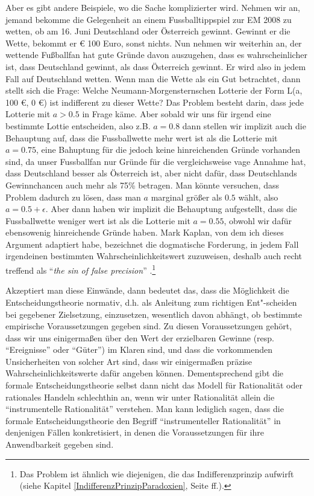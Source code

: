 Aber es gibt andere Beispiele, wo die Sache komplizierter wird. Nehmen wir an,
jemand bekomme die Gelegenheit an einem Fussballtippspiel zur EM 2008 zu wetten,
ob am 16. Juni Deutschland oder Österreich gewinnt. Gewinnt er die Wette, bekommt
er € 100 Euro, sonst nichts. Nun nehmen wir weiterhin an, der wettende Fußballfan
hat gute Gründe davon auszugehen, dass es wahrscheinlicher ist, dass Deutschland
gewinnt, als dass Österreich gewinnt. Er wird also in jedem Fall auf Deutschland
wetten. Wenn man die Wette als ein Gut betrachtet, dann stellt sich die Frage:
Welche Neumann-Morgensternschen Lotterie der Form L(a, 100 €, 0 €) ist
indifferent zu dieser Wette? Das Problem besteht darin, dass jede Lotterie mit $a
> 0.5$ in Frage käme. Aber sobald wir uns für irgend eine bestimmte Lottie
entscheiden, also z.B. $a = 0.8$ dann stellen wir implizit auch die Behauptung
auf, dass die Fussballwette mehr wert ist als die Lotterie mit $a = 0.75$, eine
Bahuptung für die jedoch keine hinreichenden Gründe vorhanden sind, da unser
Fussballfan nur Gründe für die vergleichsweise vage Annahme hat, dass Deutschland
besser als Österreich ist, aber nicht dafür, dass Deutschlands Gewinnchancen auch
mehr als 75\% betragen. Man könnte versuchen, dass Problem dadurch zu lösen, dass
man $a$ marginal größer als $0.5$ wählt, also $a = 0.5 + \epsilon $. Aber dann
haben wir implizit die Behauptung aufgestellt, dass die Fussballwette weniger
wert ist als die Lotterie mit $a = 0.55$, obwohl wir dafür ebensowenig
hinreichende Gründe haben. Mark Kaplan, von dem ich dieses Argument adaptiert
habe, bezeichnet die dogmatische Forderung, in jedem Fall
irgendeinen bestimmten Wahrscheinlichkeitswert zuzuweisen, deshalb auch recht
treffend als "`{\em the sin of false precision}"' \cite[S.
23]{kaplan:1996}.\footnote{Das Problem ist ähnlich wie diejenigen, die das
Indifferenzprinzip aufwirft (siehe Kapitel \ref{IndifferenzPrinzipParadoxien},
Seite \pageref{IndifferenzPrinzipParadoxien}ff.).}

Akzeptiert man diese Einwände, dann bedeutet das, dass die Möglichkeit die
Entscheidungstheorie normativ, d.h. als Anleitung zum richtigen Ent"-scheiden
bei gegebener Zielsetzung, einzusetzen, wesentlich davon abhängt, ob bestimmte
empirische Voraussetzungen gegeben sind. Zu diesen Voraussetzungen gehört, dass
wir uns einigermaßen über den Wert der erzielbaren Gewinne (resp.
"`Ereignisse"' oder "`Güter"') im Klaren sind, und dass die vorkommenden
Unsicherheiten von solcher Art sind, dass wir einigermaßen präzise
Wahrscheinlichkeitswerte dafür angeben können. Dementsprechend gibt die formale
Entscheidungstheorie selbst dann nicht das Modell für Rationalität oder
rationales Handeln schlechthin an, wenn wir unter Rationalität allein die
"`instrumentelle Rationalität"' verstehen. Man kann lediglich sagen, dass die
formale Entscheidungstheorie den Begriff "`instrumenteller Rationalität"' in
denjenigen Fällen konkretisiert, in denen die Voraussetzungen für ihre
Anwendbarkeit gegeben sind.


